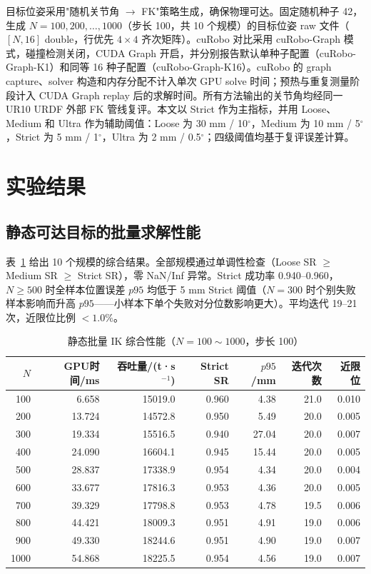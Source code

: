 \documentclass[twocolumn,a4paper,10pt]{ctexart}
\begin{document}
目标位姿采用"随机关节角 $\to$ FK"策略生成，确保物理可达。固定随机种子 42，生成 $N=100,200,\dots,1000$（步长 100，共 10 个规模）的目标位姿 raw 文件（$[N,16]$ double，行优先 $4\times4$ 齐次矩阵）。cuRobo 对比采用 cuRobo-Graph 模式，碰撞检测关闭，CUDA Graph 开启，并分别报告默认单种子配置（cuRobo-Graph-K1）和同等 16 种子配置（cuRobo-Graph-K16）。cuRobo 的 graph capture、solver 构造和内存分配不计入单次 GPU solve 时间；预热与重复测量阶段计入 CUDA Graph replay 后的求解时间。所有方法输出的关节角均经同一 UR10 URDF 外部 FK 管线复评。本文以 Strict 作为主指标，并用 Loose、Medium 和 Ultra 作为辅助阈值：Loose 为 30 mm / 10$^\circ$，Medium 为 10 mm / 5$^\circ$，Strict 为 5 mm / 1$^\circ$，Ultra 为 2 mm / 0.5$^\circ$；四级阈值均基于复评误差计算。

\section{实验结果}

\subsection{静态可达目标的批量求解性能}

表~\ref{tab:static} 给出 10 个规模的综合结果。全部规模通过单调性检查（Loose SR $\ge$ Medium SR $\ge$ Strict SR），零 NaN/Inf 异常。Strict 成功率 0.940--0.960，$N\ge500$ 时全样本位置误差 $p95$ 均低于 5 mm Strict 阈值（$N=300$ 时个别失败样本影响而升高 $p95$——小样本下单个失败对分位数影响更大）。平均迭代 19--21 次，近限位比例 $<1.0\%$。

\begin{table}[tp]
\centering
\caption{静态批量 IK 综合性能（$N=100\sim1000$，步长 100）}
\label{tab:static}
\small
\begin{tabular}{rrrrrrr}
\toprule
$N$ & GPU时间/ms & 吞吐量/(t·s$^{-1}$) & Strict SR & $p95$/mm & 迭代次数 & 近限位\\
\midrule
100  & 6.658  & 15019.0 & 0.960 & 4.38 & 21.0 & 0.010\\
200  & 13.724 & 14572.8 & 0.950 & 5.49 & 20.0 & 0.005\\
300  & 19.334 & 15516.5 & 0.940 & 27.04 & 20.0 & 0.007\\
400  & 24.090 & 16604.1 & 0.945 & 15.44 & 20.0 & 0.005\\
500  & 28.837 & 17338.9 & 0.954 & 4.34 & 20.0 & 0.004\\
600  & 33.677 & 17816.3 & 0.953 & 4.36 & 20.0 & 0.005\\
700  & 39.329 & 17798.8 & 0.953 & 4.78 & 19.5 & 0.006\\
800  & 44.421 & 18009.3 & 0.951 & 4.91 & 19.0 & 0.006\\
900  & 49.330 & 18244.6 & 0.951 & 4.90 & 19.0 & 0.007\\
1000 & 54.868 & 18225.5 & 0.954 & 4.56 & 19.0 & 0.007\\
\bottomrule
\end{tabular}
\end{table}
\end{document}
